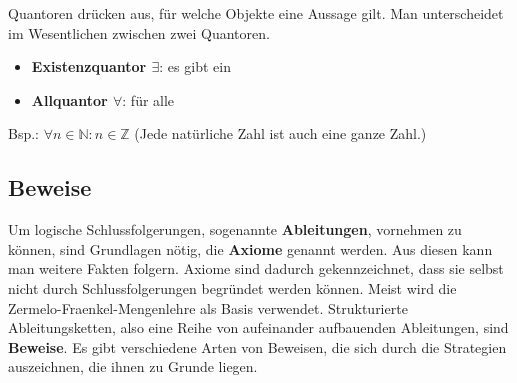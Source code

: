 Quantoren drücken aus, für welche Objekte eine Aussage gilt. Man unterscheidet im Wesentlichen zwischen zwei Quantoren.
\begin{itemize}
	\item \textbf{Existenzquantor $\exists$}: \glqq es gibt ein\grqq
	\item \textbf{Allquantor $\forall$}: \glqq f{\"u}r alle\grqq
\end{itemize}
Bsp.: $\forall n\in \mathbb{N}: n\in \mathbb{Z}$
(Jede natürliche Zahl ist auch eine ganze Zahl.)



\subsection{Beweise}

Um logische Schlussfolgerungen, sogenannte \textbf{Ableitungen}, vornehmen zu k{\"o}nnen, sind Grundlagen n{\"o}tig, die \textbf{Axiome} genannt werden. Aus diesen kann man weitere Fakten folgern. Axiome sind dadurch gekennzeichnet, dass sie selbst nicht durch Schlussfolgerungen begründet werden können. Meist wird die Zermelo-Fraenkel-Mengenlehre als Basis verwendet. Strukturierte Ableitungsketten, also eine Reihe von aufeinander aufbauenden Ableitungen, sind \textbf{Beweise}. Es gibt verschiedene Arten von Beweisen, die sich durch die Strategien auszeichnen, die ihnen zu Grunde liegen.

